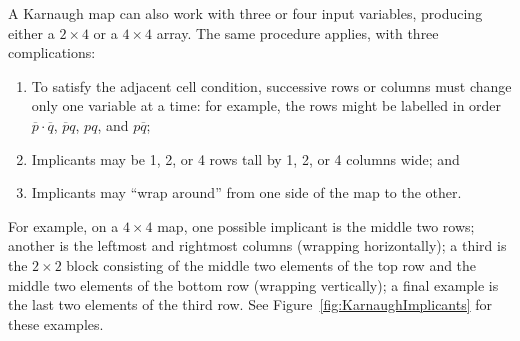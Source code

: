 A Karnaugh map can also work with three or four input variables, producing either a $2\times 4$ or a $4\times 4$ array. The same procedure applies, with three complications:
\begin{enumerate}
\item To satisfy the adjacent cell condition, successive rows or columns must change only one variable at a time: for example, the rows might be labelled in order $\overline{p}\cdot\overline{q}$, $\overline{p}q$, $pq$, and $p\overline{q}$;
\item Implicants may be 1, 2, or 4 rows tall by 1, 2, or 4 columns wide; and
\item Implicants may ``wrap around'' from one side of the map to the other.
\end{enumerate}
For example, on a $4\times 4$ map, one possible implicant is the middle two rows; another is the leftmost and rightmost columns (wrapping horizontally); a third is the $2\times 2$ block consisting of the middle two elements of the top row and the middle two elements of the bottom row (wrapping vertically); a final example is the last two elements of the third row. See Figure~\ref{fig:KarnaughImplicants} for these examples.

